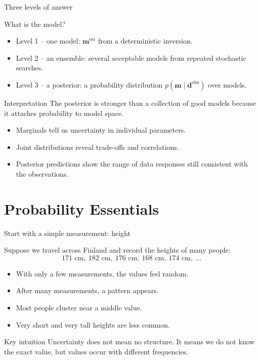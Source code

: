 \documentclass[aspectratio=169]{beamer}
\renewcommand{\vec}[1]{\mathbf{#1}}
\newcommand{\dobs}{{\vec{d}^{\text{obs}}}}
\newcommand{\mm}{ {\vec{m}} }
\newcommand{\mest}{ {\vec{m}^{\text{est}}} }
\begin{document}
\begin{frame}{Three levels of answer}
\small

\begin{block}{What is the model?}
\begin{itemize}
    \item[--] \alert{Level 1 -- one model}: $\mest$ from a deterministic inversion.
    \item[--] \alert{Level 2 -- an ensemble}: several acceptable models from repeated stochastic searches.
    \item[--] \alert{Level 3 -- a posterior}: a probability distribution $p(\mm\mid\dobs)$ over models.
\end{itemize}
\end{block}

\begin{alertblock}{Interpretation}
The posterior is stronger than a collection of good models because it attaches probability to model space.
\end{alertblock}

\begin{itemize}
    \item[--] Marginals tell us uncertainty in individual parameters.
    \item[--] Joint distributions reveal trade-offs and correlations.
    \item[--] Posterior predictions show the range of data responses still consistent with the observations.
\end{itemize}
\end{frame}

\section{Probability Essentials}

\begin{frame}{Start with a simple measurement: height}
\small

Suppose we travel across Finland and record the heights of many people:
\[
171\text{ cm},\ 182\text{ cm},\ 176\text{ cm},\ 168\text{ cm},\ 174\text{ cm},\ \dots
\]

\begin{itemize}
    \item[--] With only a few measurements, the values feel random.
    \item[--] After many measurements, a pattern appears.
    \item[--] Most people cluster near a middle value.
    \item[--] Very short and very tall heights are less common.
\end{itemize}

\begin{alertblock}{Key intuition}
Uncertainty does not mean \alert{no structure}. It means we do not know the exact value, but values occur with different frequencies.
\end{alertblock}
\end{frame}
\end{document}
